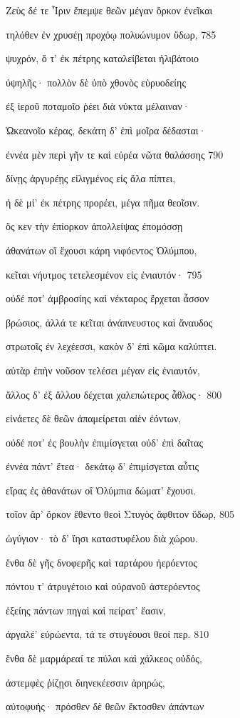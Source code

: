 Ζεὺς δέ τε Ἶριν ἔπεμψε θεῶν μέγαν ὅρκον ἐνεῖκαι

τηλόθεν ἐν χρυσέῃ προχόῳ πολυώνυμον ὕδωρ, \num{785} 

ψυχρόν, ὅ τ' ἐκ πέτρης καταλείβεται ἠλιβάτοιο 

ὑψηλῆς· πολλὸν δὲ ὑπὸ χθονὸς εὐρυοδείης 

ἐξ ἱεροῦ ποταμοῖο ῥέει διὰ νύκτα μέλαιναν· 

Ὠκεανοῖο κέρας, δεκάτη δ' ἐπὶ μοῖρα δέδασται· 

ἐννέα μὲν περὶ γῆν τε καὶ εὐρέα νῶτα θαλάσσης \num{790}

δίνῃς ἀργυρέῃς εἱλιγμένος εἰς ἅλα πίπτει,

ἡ δὲ μί' ἐκ πέτρης προρέει, μέγα πῆμα θεοῖσιν. 

ὅς κεν τὴν ἐπίορκον ἀπολλείψας ἐπομόσσῃ

ἀθανάτων οἳ ἔχουσι κάρη νιφόεντος Ὀλύμπου,

κεῖται νήυτμος τετελεσμένον εἰς ἐνιαυτόν· \num{795} 

οὐδέ ποτ' ἀμβροσίης καὶ νέκταρος ἔρχεται ἆσσον

βρώσιος, ἀλλά τε κεῖται ἀνάπνευστος καὶ ἄναυδος

στρωτοῖς ἐν λεχέεσσι, κακὸν δ' ἐπὶ κῶμα καλύπτει.

αὐτὰρ ἐπὴν νοῦσον τελέσει μέγαν εἰς ἐνιαυτόν,

ἄλλος δ' ἐξ ἄλλου δέχεται χαλεπώτερος ἆθλος· \num{800} 

εἰνάετες δὲ θεῶν ἀπαμείρεται αἰὲν ἐόντων,

οὐδέ ποτ' ἐς βουλὴν ἐπιμίσγεται οὐδ' ἐπὶ δαῖτας

ἐννέα πάντ' ἔτεα· δεκάτῳ δ' ἐπιμίσγεται αὖτις 

εἴρας ἐς ἀθανάτων οἳ Ὀλύμπια δώματ' ἔχουσι. 

τοῖον ἄρ' ὅρκον ἔθεντο θεοὶ Στυγὸς ἄφθιτον ὕδωρ, \num{805} 

ὠγύγιον· τὸ δ' ἵησι καταστυφέλου διὰ χώρου. 

ἔνθα δὲ γῆς δνοφερῆς καὶ ταρτάρου ἠερόεντος 

πόντου τ' ἀτρυγέτοιο καὶ οὐρανοῦ ἀστερόεντος

ἑξείης πάντων πηγαὶ καὶ πείρατ' ἔασιν, 

ἀργαλέ' εὐρώεντα, τά τε στυγέουσι θεοί περ. \num{810}

ἔνθα δὲ μαρμάρεαί τε πύλαι καὶ χάλκεος οὐδός, 

ἀστεμφὲς ῥίζῃσι διηνεκέεσσιν ἀρηρώς, 

αὐτοφυής· πρόσθεν δὲ θεῶν ἔκτοσθεν ἁπάντων 

